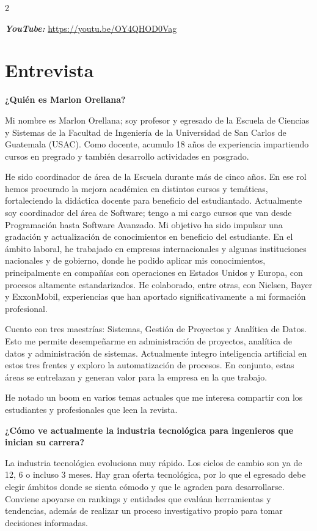 \documentclass[12pt,spanish,Letterpaper,openany]{book}
\begin{document}
\begin {multicols}{2}

\textbf{\emph{YouTube:}} \url{https://youtu.be/OY4QHOD0Vag}

\section{Entrevista}\label{entrevista-1}

\textbf{¿Quién es Marlon Orellana?}

Mi nombre es Marlon Orellana; soy profesor y egresado de la Escuela de Ciencias y Sistemas de la Facultad de Ingeniería de la Universidad de San Carlos de Guatemala (USAC). Como docente, acumulo 18 años de experiencia impartiendo cursos en pregrado y también desarrollo actividades en posgrado.

He sido coordinador de área de la Escuela durante más de cinco años. En ese rol hemos procurado la mejora académica en distintos cursos y temáticas, fortaleciendo la didáctica docente para beneficio del estudiantado. Actualmente soy coordinador del área de Software; tengo a mi cargo cursos que van desde Programación hasta Software Avanzado. Mi objetivo ha sido impulsar una gradación y actualización de conocimientos en beneficio del estudiante.
En el ámbito laboral, he trabajado en empresas internacionales y algunas instituciones nacionales y de gobierno, donde he podido aplicar mis conocimientos, principalmente en compañías con operaciones en Estados Unidos y Europa, con procesos altamente estandarizados. He colaborado, entre otras, con Nielsen, Bayer y ExxonMobil, experiencias que han aportado significativamente a mi formación profesional.

Cuento con tres maestrías: Sistemas, Gestión de Proyectos y Analítica de Datos. Esto me permite desempeñarme en administración de proyectos, analítica de datos y administración de sistemas. Actualmente integro inteligencia artificial en estos tres frentes y exploro la automatización de procesos. En conjunto, estas áreas se entrelazan y generan valor para la empresa en la que trabajo.

He notado un boom en varios temas actuales que me interesa compartir con los estudiantes y profesionales que leen la revista.

\textbf{¿Cómo ve actualmente la industria tecnológica para ingenieros que inician su carrera?}

La industria tecnológica evoluciona muy rápido. Los ciclos de cambio son ya de 12, 6 o incluso 3 meses. Hay gran oferta tecnológica, por lo que el egresado debe elegir ámbitos donde se sienta cómodo y que le agraden para desarrollarse.
Conviene apoyarse en rankings y entidades que evalúan herramientas y tendencias, además de realizar un proceso investigativo propio para tomar decisiones informadas.


\end{multicols}
\end{document}

